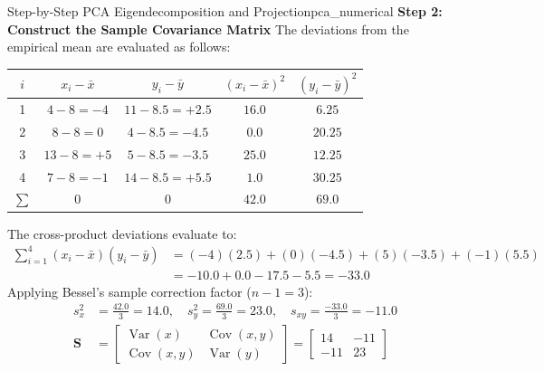 \begin{example}{Step-by-Step PCA Eigendecomposition and Projection}{pca_numerical}
\textbf{Step 2: Construct the Sample Covariance Matrix}
The deviations from the empirical mean are evaluated as follows:
\begin{center}
\renewcommand{\arraystretch}{1.2}
\begin{tabular}{ccccc}
\toprule
$i$ & $x_i - \bar{x}$ & $y_i - \bar{y}$ & $(x_i - \bar{x})^2$ & $(y_i - \bar{y})^2$ \\
\midrule
1 & $4 - 8 = -4$ & $11 - 8.5 = +2.5$ & $16.0$ & $6.25$ \\
2 & $8 - 8 = 0$  & $4 - 8.5 = -4.5$  & $0.0$  & $20.25$ \\
3 & $13 - 8 = +5$& $5 - 8.5 = -3.5$  & $25.0$ & $12.25$ \\
4 & $7 - 8 = -1$ & $14 - 8.5 = +5.5$ & $1.0$  & $30.25$ \\
\midrule
$\sum$ & $0$ & $0$ & $42.0$ & $69.0$ \\
\bottomrule
\end{tabular}
\end{center}
The cross-product deviations evaluate to:
\begin{align*}
    \sum_{i=1}^4 (x_i - \bar{x})(y_i - \bar{y}) &= (-4)(2.5) + (0)(-4.5) + (5)(-3.5) + (-1)(5.5) \\
    &= -10.0 + 0.0 - 17.5 - 5.5 = -33.0
\end{align*}
Applying Bessel's sample correction factor ($n - 1 = 3$):
\begin{align*}
    s_x^2 &= \frac{42.0}{3} = 14.0, \quad s_y^2 = \frac{69.0}{3} = 23.0, \quad s_{xy} = \frac{-33.0}{3} = -11.0 \\[4pt]
    \mathbf{S} &= \begin{bmatrix}
    \operatorname{Var}(x) & \operatorname{Cov}(x, y) \\
    \operatorname{Cov}(x, y) & \operatorname{Var}(y)
    \end{bmatrix} = \begin{bmatrix}
    14 & -11 \\
    -11 & 23
    \end{bmatrix}
\end{align*}


\end{example}
